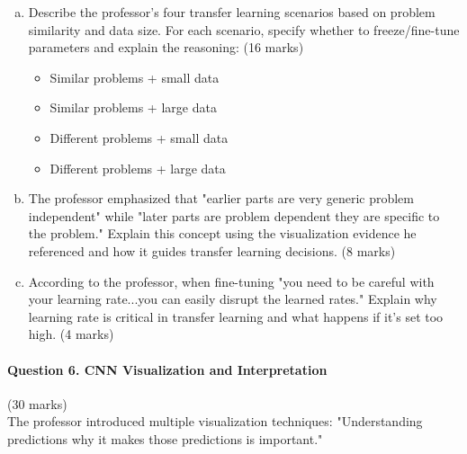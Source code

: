 \documentclass[12pt]{article}
\newcommand{\shortanswer}{\vspace{2cm}}
\newcommand{\mediumanswer}{\vspace{3cm}}
\newcommand{\journalspace}{\vspace{4.5cm}}
\begin{document}
\begin{enumerate}[(a)]
    \item Describe the professor's four transfer learning scenarios based on problem similarity and data size. For each scenario, specify whether to freeze/fine-tune parameters and explain the reasoning: \hfill (16 marks)
    \begin{itemize}
        \item Similar problems + small data
        \item Similar problems + large data  
        \item Different problems + small data
        \item Different problems + large data
    \end{itemize}
    
    \journalspace
    
    \item The professor emphasized that "earlier parts are very generic problem independent" while "later parts are problem dependent they are specific to the problem." Explain this concept using the visualization evidence he referenced and how it guides transfer learning decisions. \hfill (8 marks)
    
    \mediumanswer
    
    \item According to the professor, when fine-tuning "you need to be careful with your learning rate...you can easily disrupt the learned rates." Explain why learning rate is critical in transfer learning and what happens if it's set too high. \hfill (4 marks)
    
    \shortanswer
\end{enumerate}

\newpage
\paragraph{Question 6. CNN Visualization and Interpretation}{\hfill (30 marks)}\\
The professor introduced multiple visualization techniques: "Understanding predictions why it makes those predictions is important."
\end{document}
